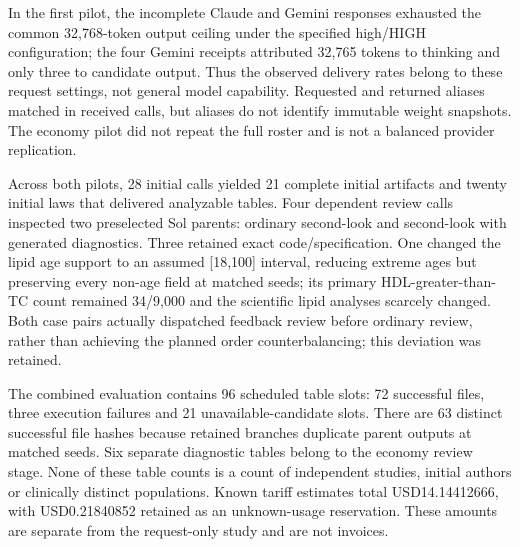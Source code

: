 \documentclass[11pt,letterpaper]{article}
\begin{document}
\endgroup

In the first pilot, the incomplete Claude and Gemini responses exhausted the common 32,768-token output ceiling under the specified high/\allowbreak{}HIGH configuration; the four Gemini receipts attributed 32,765 tokens to thinking and only three to candidate output. Thus the observed delivery rates belong to these request settings, not general model capability. Requested and returned aliases matched in received calls, but aliases do not identify immutable weight snapshots. The economy pilot did not repeat the full roster and is not a balanced provider replication.


Across both pilots, 28 initial calls yielded 21 complete initial artifacts and twenty initial laws that delivered analyzable tables. Four dependent review calls inspected two preselected Sol parents: ordinary second-look and second-look with generated diagnostics. Three retained exact code/\allowbreak{}specification. One changed the lipid age support to an assumed [18,100] interval, reducing extreme ages but preserving every non-age field at matched seeds; its primary HDL-greater-than-TC count remained 34/\allowbreak{}9,000 and the scientific lipid analyses scarcely changed. Both case pairs actually dispatched feedback review before ordinary review, rather than achieving the planned order counterbalancing; this deviation was retained.


The combined evaluation contains 96 scheduled table slots: 72 successful files, three execution failures and 21 unavailable-candidate slots. There are 63 distinct successful file hashes because retained branches duplicate parent outputs at matched seeds. Six separate diagnostic tables belong to the economy review stage. None of these table counts is a count of independent studies, initial authors or clinically distinct populations. Known tariff estimates total USD14.14412666, with USD0.21840852 retained as an unknown-usage reservation. These amounts are separate from the request-only study and are not invoices.


\FloatBarrier

\begingroup

\small

\renewcommand{\arraystretch}{1.22}
\end{document}
